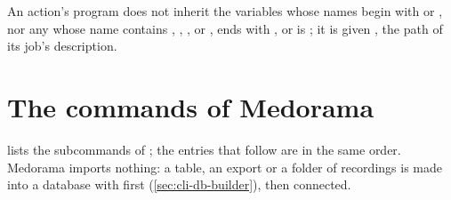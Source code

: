 An action's program does not inherit the variables whose names begin with  or
, nor any whose name contains , , ,
 or , ends with , or is ; it is
given , the path of its job's description.

\section{The commands of Medorama}
\label{sec:cli-medorama}

 lists the subcommands of ; the entries that follow are
in the same order. Medorama imports nothing: a table, an export or a folder of recordings is made
into a database with  first (\cref{sec:cli-db-builder}), then connected.

